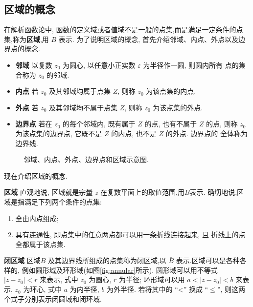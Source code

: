 



\subsection{区域的概念}
\label{sub:domain}
在解析函数论中, 函数的定义域或者值域不是一般的点集,而是满足一定条件的点集,称为{\bf 区域},用 $B$ 表示.
为了说明区域的概念, 首先介绍邻域、内点、外点以及边界点的概念.

\begin{itemize}
\item {\bf 邻域} \quad 以复数 $z_0$ 为圆心, 以任意小正实数 $\varepsilon$ 为半径作一圆, 则圆内所有 点的集合称为 $z_0$ 的邻域.
\item {\bf 内点} \quad 若 $z_0$ 及其邻域均属于点集 $Z$, 则称 $z_0$ 为该点集的内点.
\item {\bf 外点} \quad 若 $z_0$ 及其邻域均不属于点集 $Z$, 则称 $z_0$ 为该点集的外点.
\item {\bf 边界点}  \quad 若在 $z_0$ 的每个邻域内, 既有属于 $Z$ 的点, 也有不属于 $Z$ 的点, 
        则称 $z_0$ 为该点集的边界点, 它既不是 $Z$ 的内点, 也不是 $Z$ 的外点. 边界点的 全体称为边界线.
\end{itemize}

\begin{figure}[htb]
    \centering
    
    \caption{邻域、内点、外点、边界点和区域示意图.}
    \label{fig:region}
\end{figure}

现在介绍区域的概念. 

\textbf{区域} \quad 直观地说,  区域就是宗量 $z$ 在复数平面上的取值范围,用$B$表示. 
确切地说,区域是指满足下列两个条件的点集:
    \begin{enumerate}
        \item 全由内点组成;
        \item 具有连通性, 即点集中的任意两点都可以用一条折线连接起来, 且 折线上的点全都属于该点集.
    \end{enumerate}

\textbf{闭区域} \quad 区域$B$ 及其边界线所组成的点集称为闭区域,以 $\bar{B}$ 表示.区域可以是各种各样的, 例如圆形域及环形域(如图\ref{fig:annular}所示). 
圆形域可以用不等式 $\left|z-z_0\right|<r$ 来表示, 式中 $z_0$ 为圆心, $r$ 为半径; 
环形域可以用 $a<\left|z-z_0\right|<b$ 来表示, $z_0$ 为环心, 式中 $a$ 为内半径, $b$ 为外半径.
 若将其中的 “<” 换成 $“ \leqslant ”$, 则这两个式子分别表示闭圆域和闭环域.

